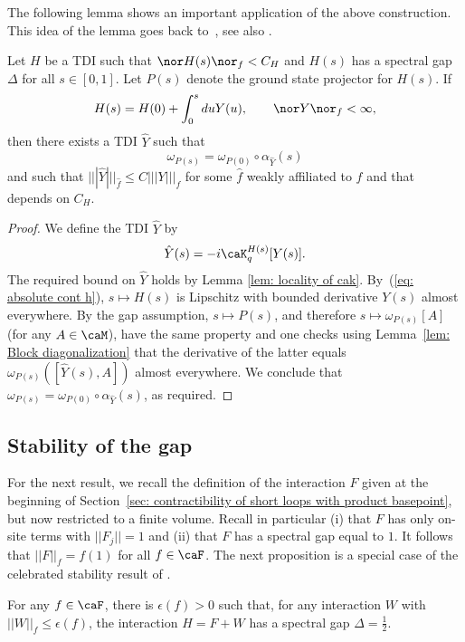 The following lemma shows an important application of the above construction. This idea of the lemma goes back to~\cite{hastings2005quasiadiabatic}, see also \cite{bachmann2012automorphic}. 
\begin{lemma}\label{lem: automorphic equivalence} Let $H$ be a TDI such that $\nor H(s)\nor_f<C_H$ and $H(s)$ has a spectral gap $\Delta$ for all $s\in [0,1]$. Let $P(s)$ denote the ground state projector for $H(s)$.
	If
	\begin{equation}\label{eq: absolute cont h} 
		H(s)= H(0) + \int_0^s du Y(u), \qquad    \nor Y\nor_f  <\infty,
	\end{equation}
	then there exists a TDI $\hat Y $ such that 
	$$\omega_{P(s)}=\omega_{P(0)} \circ \alpha_{\hat Y}(s)  $$  and such that $|||\hat Y|||_{\hat{f}} \leq C |||Y|||_f$ for some $\hat{f}$ weakly affiliated to $f$ and that depends on $C_H$. 
\end{lemma}  
\begin{proof}
	We define the TDI $\hat Y$ by
	$$
	\hat Y(s)= -i\caK_q^{H(s)}[Y(s)].
	$$
	The required bound on $\hat Y$ holds by Lemma \ref{lem: locality of cak}. By~(\ref{eq: absolute cont h}), $s\mapsto H(s)$ is Lipschitz with bounded derivative $Y(s)$ almost everywhere. By the gap assumption, $s\mapsto P(s)$, and therefore $s\mapsto \omega_{P(s)}[A]$ (for any $A\in\caM$), have the same property and one checks using Lemma~\ref{lem: Block diagonalization} that the derivative of the latter equals $\omega_{P(s)}([\hat{Y}(s),A])$ almost everywhere. We conclude that $\omega_{P(s)} =\omega_{P(0)}\circ \alpha_{\hat Y}(s)$, as required. 
\end{proof}


\subsection{Stability of the gap}\label{sec: stability of gap}
For the next result, we recall the definition of the interaction $F$ given at the beginning of Section~\ref{sec: contractibility of short loops with product basepoint}, but now restricted to a finite volume. 
Recall in particular (i) that $F$ has only on-site terms with $||F_j||=1$ and (ii) that $F$ has a spectral gap equal to $1$. It follows that $||F||_f = f(1)$ for all $f\in\caF$.
The next proposition is a special case of the celebrated stability result of \cite{bravyi2010topological}.
\begin{proposition} \label{prop: stability of gap} 
	For any $f\in\caF$, there is $\epsilon(f)>0$ such that, for any interaction $W$ with $||W||_f\leq \epsilon(f)$,  the interaction 
	$
	H=F+W
	$ has a spectral gap $\Delta=\tfrac{1}{2}$.  
\end{proposition}


